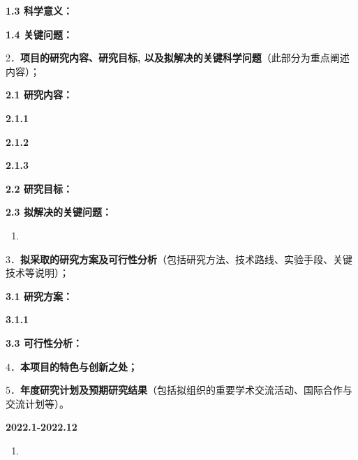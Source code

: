 \documentclass[UTF8,A4]{ctexart}
\newcommand{\blue}{\textcolor[rgb]{0.00,0.44,0.75}}
\begin{document}
\noindent\textbf{1.3 科学意义：}



\noindent\textbf{1.4 关键问题：}



\begin{spacing}{1.2}
 \songti


\end{spacing}
\pagebreak[4]
\begin{spacing}{1.6}
\kaishu\blue{2．\textbf{项目的研究内容、研究目标, 以及拟解决的关键科学问题}（此部分为重点阐述内容）；}
\end{spacing}
\noindent\textbf{2.1 研究内容：}



\noindent\textbf{2.1.1 }



\noindent\textbf{2.1.2}


\noindent\textbf{2.1.3}


\noindent\textbf{2.2 研究目标：}


\noindent\textbf{2.3 拟解决的关键问题：}
\begin{enumerate}
  \item
\end{enumerate}
\pagebreak[4]
\begin{spacing}{1.6}
\kaishu
\blue{3．\textbf{拟采取的研究方案及可行性分析}（包括研究方法、技术路线、实验手段、关键技术等说明）；}
\end{spacing}
\noindent\textbf{3.1 研究方案：}



\noindent\textbf{3.1.1}


\noindent\textbf{3.3 可行性分析：}



\pagebreak[4]
\begin{spacing}{1.6}
\kaishu
\blue{4．\textbf{本项目的特色与创新之处；}}
\end{spacing}



\begin{spacing}{1.6}
\kaishu
\blue{5．\textbf{年度研究计划及预期研究结果}（包括拟组织的重要学术交流活动、国际合作与交流计划等）。}
\end{spacing}
\noindent\textbf{2022.1-2022.12}
\begin{enumerate}
  \item
\end{enumerate}
\end{document}
